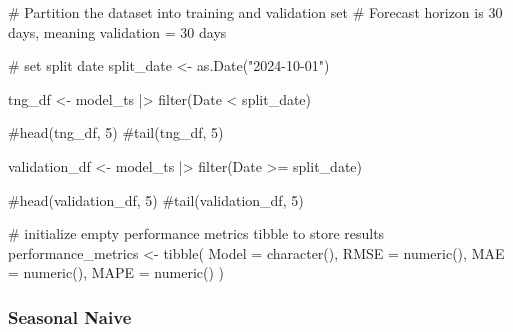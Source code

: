 \documentclass[
  letterpaper,
  DIV=11,
  numbers=noendperiod]{scrartcl}
\newenvironment{Shaded}{\begin{snugshade}}{\end{snugshade}}
\newcommand{\AttributeTok}[1]{\textcolor[rgb]{0.40,0.45,0.13}{#1}}
\newcommand{\CommentTok}[1]{\textcolor[rgb]{0.37,0.37,0.37}{#1}}
\newcommand{\FunctionTok}[1]{\textcolor[rgb]{0.28,0.35,0.67}{#1}}
\newcommand{\NormalTok}[1]{\textcolor[rgb]{0.00,0.23,0.31}{#1}}
\newcommand{\OtherTok}[1]{\textcolor[rgb]{0.00,0.23,0.31}{#1}}
\newcommand{\SpecialCharTok}[1]{\textcolor[rgb]{0.37,0.37,0.37}{#1}}
\newcommand{\StringTok}[1]{\textcolor[rgb]{0.13,0.47,0.30}{#1}}
\begin{document}
\begin{Shaded}
\begin{Highlighting}[]
\CommentTok{\# Partition the dataset into training and validation set}
\CommentTok{\# Forecast horizon is 30 days, meaning validation = 30 days}

\CommentTok{\# set split date}
\NormalTok{split\_date }\OtherTok{\textless{}{-}} \FunctionTok{as.Date}\NormalTok{(}\StringTok{"2024{-}10{-}01"}\NormalTok{)}

\NormalTok{tng\_df }\OtherTok{\textless{}{-}}\NormalTok{ model\_ts }\SpecialCharTok{|\textgreater{}}
  \FunctionTok{filter}\NormalTok{(Date }\SpecialCharTok{\textless{}}\NormalTok{ split\_date)}

\CommentTok{\#head(tng\_df, 5)}
\CommentTok{\#tail(tng\_df, 5)}

\NormalTok{validation\_df }\OtherTok{\textless{}{-}}\NormalTok{ model\_ts }\SpecialCharTok{|\textgreater{}}
  \FunctionTok{filter}\NormalTok{(Date }\SpecialCharTok{\textgreater{}=}\NormalTok{ split\_date)}

\CommentTok{\#head(validation\_df, 5)}
\CommentTok{\#tail(validation\_df, 5)}
\end{Highlighting}
\end{Shaded}

\begin{Shaded}
\begin{Highlighting}[]
\CommentTok{\# initialize empty performance metrics tibble to store results}
\NormalTok{performance\_metrics }\OtherTok{\textless{}{-}} \FunctionTok{tibble}\NormalTok{(}
  \AttributeTok{Model =} \FunctionTok{character}\NormalTok{(),}
  \AttributeTok{RMSE =} \FunctionTok{numeric}\NormalTok{(),}
  \AttributeTok{MAE =} \FunctionTok{numeric}\NormalTok{(),}
  \AttributeTok{MAPE =} \FunctionTok{numeric}\NormalTok{()}
\NormalTok{)}
\end{Highlighting}
\end{Shaded}

\subsubsection{Seasonal Naive}\label{seasonal-naive}
\end{document}
